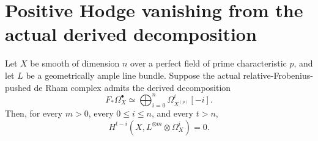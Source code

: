 \section{Positive Hodge vanishing from the actual derived decomposition}

\begin{theorem}
\label{thm:kn-positive-hodge-from-di}
\leanok
Let $X$ be smooth of dimension $n$ over a perfect field of prime
characteristic $p$, and let $L$ be a geometrically ample line bundle.
Suppose the actual relative-Frobenius-pushed de Rham complex admits the
derived decomposition
\[
 F_*\Omega_X^\bullet\simeq
 \bigoplus_{i=0}^n\Omega_{X^{(p)}}^i[-i].
\]
Then, for every $m>0$, every $0\leq i\leq n$, and every $t>n$,
\[
 H^{t-i}(X,L^{\otimes m}\otimes\Omega_X^i)=0.
\]
\end{theorem}
